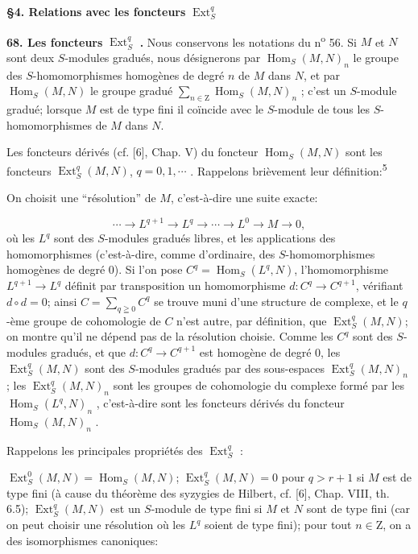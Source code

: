 \textbf{\S4. Relations avec les foncteurs} $\operatorname{Ext}_S^q$

\textbf{68. Les foncteurs} $\operatorname{Ext}_S^q$ \textbf{.} Nous conservons les notations du n\textsuperscript{o} 56. Si $M$ et $N$ sont deux $S$-modules gradués, nous désignerons par $\operatorname{Hom}_S(M, N)_n$ le groupe des $S$-homomorphismes homogènes de degré $n$ de $M$ dans $N$, et par $\operatorname{Hom}_S(M, N)$ le groupe gradué $\sum\nolimits_{n \in \mathrm{Z}} \operatorname{Hom}_S(M, N)_n$ ; c'est un $S$-module gradué; lorsque $M$ est de type fini il coïncide avec le $S$-module de tous les $S$-homomorphismes de $M$ dans $N$.

Les foncteurs dérivés (cf. [6], Chap. V) du foncteur $\operatorname{Hom}_S(M, N)$ sont les foncteurs $\operatorname{Ext}_S^q(M, N)$, $q = 0, 1, \cdots$ . Rappelons brièvement leur définition:\textsuperscript{5}

On choisit une ``résolution'' de $M$, c'est-à-dire une suite exacte:

\begin{equation*}
\cdots \to L^{q+1} \to L^q \to \cdots \to L^0 \to M \to 0,
\end{equation*}
où les $L^q$ sont des $S$-modules gradués libres, et les applications des homomorphismes (c'est-à-dire, comme d'ordinaire, des $S$-homomorphismes homogènes de degré 0). Si l'on pose $C^q = \operatorname{Hom}_S(L^q, N)$, l'homomorphisme $L^{q+1} \to L^q$ définit par transposition un homomorphisme $d:C^q \to C^{q+1}$, vérifiant $d \circ d = 0$; ainsi $C = \sum\nolimits_{q \geqq 0} C^q$ se trouve muni d'une structure de complexe, et le $q$-ème groupe de cohomologie de $C$ n'est autre, par définition, que $\operatorname{Ext}_S^q(M, N)$; on montre qu'il ne dépend pas de la résolution choisie. Comme les $C^q$ sont des $S$-modules gradués, et que $d:C^q \to C^{q+1}$ est homogène de degré 0, les $\operatorname{Ext}_S^q(M, N)$ sont des $S$-modules gradués par des sous-espaces $\operatorname{Ext}_S^q(M, N)_n$ ; les $\operatorname{Ext}_S^q(M, N)_n$ sont les groupes de cohomologie du complexe formé par les $\operatorname{Hom}_S(L^q, N)_n$ , c'est-à-dire sont les foncteurs dérivés du foncteur $\operatorname{Hom}_S(M, N)_n$ .

Rappelons les principales propriétés des $\operatorname{Ext}_S^q$ :

$\operatorname{Ext}_S^0(M, N) = \operatorname{Hom}_S(M, N)$; $\operatorname{Ext}_S^q(M, N) = 0$ pour $q > r + 1$ si $M$ est de type fini (à cause du théorème des syzygies de Hilbert, cf. [6], Chap. VIII, th. 6.5); $\operatorname{Ext}_S^q(M, N)$ est un $S$-module de type fini si $M$ et $N$ sont de type fini (car on peut choisir une résolution où les $L^q$ soient de type fini); pour tout $n \in \mathrm{Z}$, on a des isomorphismes canoniques:


